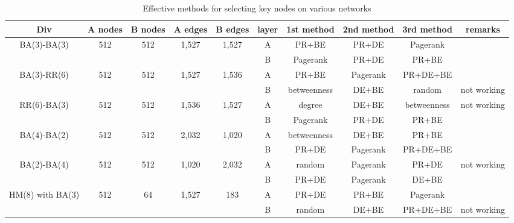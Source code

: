\begin{table}[!htb]
	\scriptsize
	\centering
	\caption{Effective methods for selecting key nodes on various networks}
	\label{effective methods}
	\begin{center}
		\begin{tabular}{c|c|c|c|c|c|c|c|c|c} \hline\hline
		  Div                              & A nodes & B nodes & A edges & B edges & layer & 1st method & 2nd method  & 3rd method  & remarks    \\ \hline \hline
         \multirow{1}{*}{BA(3)-BA(3)}      & 512 	 & 512     & 1,527   & 1,527   & A     & PR+BE      & PR+DE       & Pagerank    &            \\ 
			                               &  	     &         &         &         & B     & Pagerank   & PR+DE       & PR+BE       &		     \\ \hline   
	     \multirow{1}{*}{BA(3)-RR(6)}      & 512     & 512     & 1,527   & 1,536   & A     & PR+BE      & Pagerank    & PR+DE+BE    &            \\
	                                       &         &         &         &         & B     & betweenness& DE+BE       & random      & not working\\ \hline
	     \multirow{1}{*}{RR(6)-BA(3)}      & 512     & 512     & 1,536   & 1,527   & A     & degree     & DE+BE       & betweenness & not working\\ 
	                                       &         &         &         &         & B     & Pagerank   & PR+DE       & PR+BE       &            \\ \hline
		 \multirow{1}{*}{BA(4)-BA(2)}      & 512     & 512     & 2,032   & 1,020   & A     & betweenness& DE+BE       & PR+BE       &            \\ 
		                                   &         &         &         &         & B     & PR+DE      & Pagerank    & PR+DE+BE    &            \\ \hline
		 \multirow{1}{*}{BA(2)-BA(4)}      & 512     & 512     & 1,020   & 2,032   & A     & random     & Pagerank    & PR+DE       & not working\\ 
		                                   &         &         &         &         & B     & PR+DE      & Pagerank    & DE+BE       &            \\ \hline
		 \multirow{1}{*}{HM(8) with BA(3)} & 512     & 64      & 1,527   & 183     & A     & PR+DE      & PR+BE       & Pagerank    &            \\ 
		                                   &         &         &         &         & B     & random     & DE+BE       & PR+DE+BE    & not working\\ \hline
			\hline
		\end{tabular}
	\end{center}
\end{table}

